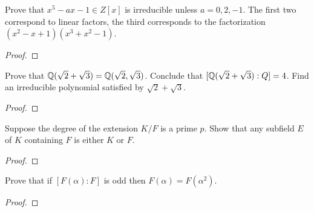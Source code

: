 \documentclass[num=6,duedate=03-17-21,course=Algebra\ II,proflastname=Walton]{hwtemplate}
\begin{document}
\separator

\problem[5]
\begin{claim}
	Prove that \(x^{5}-ax-1 \in Z[x]\) is irreducible unless \(a=0,2,-1\). The first two correspond to linear factors, the third corresponds to the factorization \((x^2-x+1)(x^3+x^2-1)\).
\end{claim}
\begin{proof}
	
\end{proof}

\problem[6]
\begin{claim}
	Prove that \(\mathbb{Q}(\sqrt{2} +\sqrt{3} ) = \mathbb{Q}(\sqrt{2} ,\sqrt{3} )\). Conclude that \([\mathbb{Q}(\sqrt{2} +\sqrt{3} ) : Q ] = 4\). Find an irreducible polynomial satisfied by \(\sqrt{2} +\sqrt{3} \). %
\end{claim}
\begin{proof}
	
\end{proof}

\problem[7]
\begin{claim}
	Suppose the degree of the extension \(K / F\) is a prime \(p\). Show that any subfield \(E\) of \(K\) containing \(F\) is either \(K\) or \(F\).
\end{claim}
\begin{proof}
	
\end{proof}

\problem[8]
\begin{claim}
	Prove that if \([F(\alpha ):F]\) is odd then \(F(\alpha ) = F(\alpha ^2)\).
\end{claim}
\begin{proof}
	
\end{proof}
\end{document}

